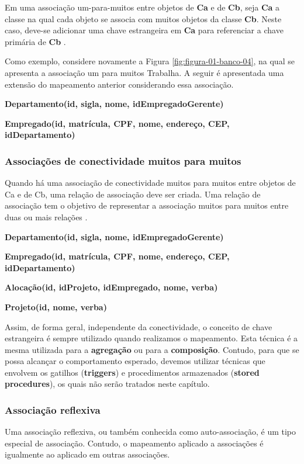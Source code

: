 Em uma associação um-para-muitos entre objetos de \textbf{Ca} e de \textbf{Cb}, seja \textbf{Ca} a classe na qual cada objeto se associa com muitos objetos da classe \textbf{Cb}. Neste caso, deve-se adicionar uma chave estrangeira em \textbf{Ca} para referenciar a chave primária de \textbf{Cb} \cite{bezerra2016principios}.

Como exemplo, considere novamente a Figura \ref{fig:figura-01-banco-04}, na qual se apresenta a associação um para muitos Trabalha. A seguir é apresentada uma extensão do mapeamento anterior considerando essa associação.

\textbf{Departamento(id, sigla, nome, idEmpregadoGerente)}

\textbf{Empregado(id, matrícula, CPF, nome, endereço, CEP, idDepartamento)}

\subsubsection{Associações de conectividade muitos para muitos}

Quando há uma associação de conectividade muitos para muitos entre objetos de Ca e de Cb, uma relação de associação deve ser criada. Uma relação de associação tem o objetivo de representar a associação muitos para muitos entre duas ou mais relações \cite{bezerra2016principios}.

\textbf{Departamento(id, sigla, nome, idEmpregadoGerente)}

\textbf{Empregado(id, matrícula, CPF, nome, endereço, CEP, idDepartamento)}

\textbf{Alocação(id, idProjeto, idEmpregado, nome, verba)}

\textbf{Projeto(id, nome, verba)}

Assim, de forma geral, independente da conectividade, o conceito de chave estrangeira é sempre utilizado quando realizamos o mapeamento. Esta técnica é a mesma utilizada para a \textbf{agregação} ou para a \textbf{composição}. Contudo, para que se possa alcançar o comportamento esperado, devemos utilizar técnicas que envolvem os gatilhos (\textbf{triggers}) e procedimentos armazenados (\textbf{stored procedures}), os quais não serão tratados neste capítulo. 

\subsubsection{Associação reflexiva}

Uma associação reflexiva, ou também conhecida como auto-associação, é um tipo especial de associação. Contudo, o mapeamento aplicado a associações é igualmente ao aplicado em outras associações.

